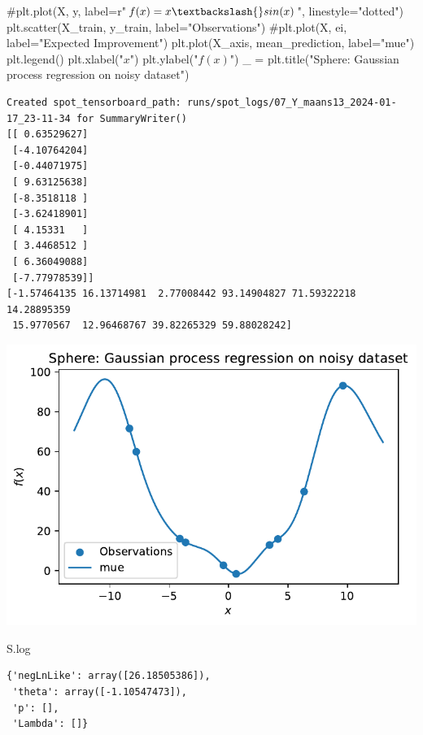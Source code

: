\documentclass[
  letterpaper,
  DIV=11,
  numbers=noendperiod]{scrreprt}
\newenvironment{Shaded}{\begin{snugshade}}{\end{snugshade}}
\newcommand{\CommentTok}[1]{\textcolor[rgb]{0.37,0.37,0.37}{#1}}
\newcommand{\NormalTok}[1]{\textcolor[rgb]{0.00,0.23,0.31}{#1}}
\newcommand{\OperatorTok}[1]{\textcolor[rgb]{0.37,0.37,0.37}{#1}}
\newcommand{\StringTok}[1]{\textcolor[rgb]{0.13,0.47,0.30}{#1}}
\begin{document}
\begin{Shaded}
\begin{Highlighting}[]
\CommentTok{\#plt.plot(X, y, label=r"$f(x) = x \textbackslash{}sin(x)$", linestyle="dotted")}
\NormalTok{plt.scatter(X\_train, y\_train, label}\OperatorTok{=}\StringTok{"Observations"}\NormalTok{)}
\CommentTok{\#plt.plot(X, ei, label="Expected Improvement")}
\NormalTok{plt.plot(X\_axis, mean\_prediction, label}\OperatorTok{=}\StringTok{"mue"}\NormalTok{)}
\NormalTok{plt.legend()}
\NormalTok{plt.xlabel(}\StringTok{"$x$"}\NormalTok{)}
\NormalTok{plt.ylabel(}\StringTok{"$f(x)$"}\NormalTok{)}
\NormalTok{\_ }\OperatorTok{=}\NormalTok{ plt.title(}\StringTok{"Sphere: Gaussian process regression on noisy dataset"}\NormalTok{)}
\end{Highlighting}
\end{Shaded}

\begin{verbatim}
Created spot_tensorboard_path: runs/spot_logs/07_Y_maans13_2024-01-17_23-11-34 for SummaryWriter()
[[ 0.63529627]
 [-4.10764204]
 [-0.44071975]
 [ 9.63125638]
 [-8.3518118 ]
 [-3.62418901]
 [ 4.15331   ]
 [ 3.4468512 ]
 [ 6.36049088]
 [-7.77978539]]
[-1.57464135 16.13714981  2.77008442 93.14904827 71.59322218 14.28895359
 15.9770567  12.96468767 39.82265329 59.88028242]
\end{verbatim}

\includegraphics{012_num_spot_ei_files/figure-pdf/cell-49-output-2.pdf}

\begin{Shaded}
\begin{Highlighting}[]
\NormalTok{S.log}
\end{Highlighting}
\end{Shaded}

\begin{verbatim}
{'negLnLike': array([26.18505386]),
 'theta': array([-1.10547473]),
 'p': [],
 'Lambda': []}
\end{verbatim}
\end{document}
